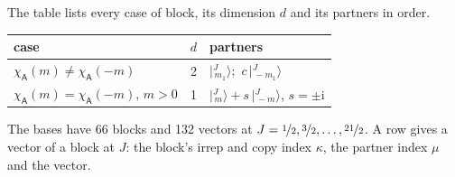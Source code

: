 \documentclass[10pt,a4paper]{article}
\numberwithin{equation}{section}
\newcommand{\grp}[1]{\mathsf{#1}}
\newcommand{\iunit}{\mathrm{i}}
\newcommand{\chiA}{\chi_{\grp{A}}}
\newcommand{\mult}{\kappa}
\newcommand{\intx}{\mu}
\newcommand{\jm}[2]{\bigl\lvert{}^{#1}_{\,#2}\bigr\rangle}
\begin{document}
\leavevmode\label{n:head.case}\label{n:head.partners}The table lists every case of block, its dimension $d$ and its partners in order.
\begin{center}\begin{tabular}{@{}lrl@{}}\toprule
case & $d$ & partners\\\midrule
$\chiA(m) \ne \chiA(-m)$ & 2 & $\jm{J}{m_1}$;\ $c\,\jm{J}{-m_1}$\\
$\chiA(m) = \chiA(-m)$, $m > 0$ & 1 & $\jm{J}{m} + s\,\jm{J}{-m}$, $s = \pm\iunit$\\
\bottomrule\end{tabular}\end{center}
The bases have 66 blocks and 132 vectors at $J = \nicefrac{1}{2}, \nicefrac{3}{2}, \dots, \nicefrac{21}{2}$. \label{n:head.vector}A row gives a vector of a block at $J$: the block's irrep and copy index $\mult$, the partner index $\intx$ and the vector.
\end{document}
